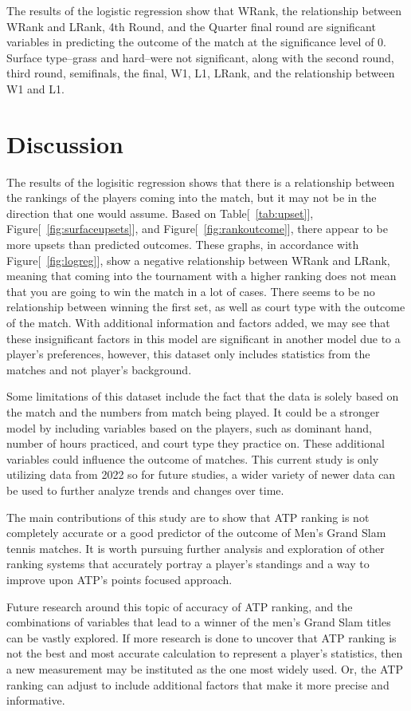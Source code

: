 \documentclass[12pt]{article}
\begin{document}
The results of the logistic regression show that WRank, the relationship between WRank and LRank, 
4th Round, and the Quarter final round are significant variables in predicting the outcome of the 
match at the significance level of 0. Surface type--grass and hard--were not significant, along 
with the second round, third round, semifinals, the final, W1, L1, LRank, and the relationship 
between W1 and L1.




\section{Discussion}
\label{sec:discussion}

The results of the logisitic regression shows that there is a relationship between the rankings of 
the players coming into the match, but it may not be in the direction that one would assume. 
Based on Table[~\ref{tab:upset}], Figure[~\ref{fig:surfaceupsets}], and Figure[~\ref{fig:rankoutcome}],
there appear to be more upsets than predicted outcomes. These graphs, in accordance with Figure[~\ref{fig:logreg}],
show a negative relationship between WRank and LRank, meaning that coming into the tournament with a higher 
ranking does not mean that you are going to win the match in a lot of cases. There seems to be no relationship 
between winning the first set, as well as court type with the outcome of the match. With additional information 
and factors added, we may see that these insignificant factors in this model are significant in another model 
due to a player's preferences, however, this dataset only includes statistics from the matches and not player's background.

Some limitations of this dataset include the fact that the data is solely based on the match  
and the numbers from match being played. It could be a stronger model by including variables 
based on the players, such as dominant hand, number of hours practiced, and court type they 
practice on. These additional variables could influence the outcome of matches. This current 
study is only utilizing data from 2022 so for future studies, a wider variety of newer data 
can be used to further analyze trends and changes over time.

The main contributions of this study are to show that ATP ranking is not completely accurate 
or a good predictor of the outcome of Men's Grand Slam tennis matches. It is worth pursuing 
further analysis and exploration of other ranking systems that accurately portray a player's 
standings and a way to improve upon ATP's points focused approach.

Future research around this topic of accuracy of ATP ranking, and the combinations of variables 
that lead to a winner of the men's Grand Slam titles can be vastly explored. If more research is done to 
uncover that ATP ranking is not the best and most accurate calculation to represent a player's 
statistics, then a new measurement may be instituted as the one most widely used. Or, the ATP 
ranking can adjust to include additional factors that make it more precise and informative. 





\end{document}
